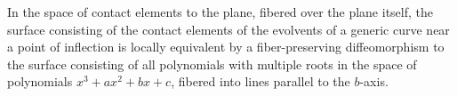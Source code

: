 In the space of contact elements to the plane, fibered over the plane itself, the surface consisting of the contact elements of the evolvents of a generic curve near a point of inflection is locally equivalent by a fiber-preserving diffeomorphism to the surface consisting of all polynomials with multiple roots in the space of polynomials $x^3 + a x^2 + b x + c$, fibered into lines parallel to the $b$-axis.
